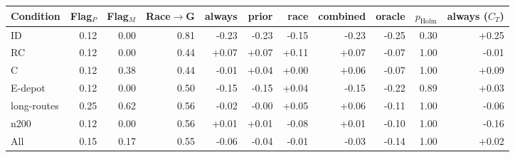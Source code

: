 \begin{tabular}{lrrrrrrrrrr}
\toprule
Condition & Flag$_{P}$ & Flag$_{M}$ & Race$\to$G & always & prior & race & combined & oracle & $p_{\mathrm{Holm}}$ & always ($C_T$) \\
\midrule
ID & 0.12 & 0.00 & 0.81 & -0.23 & -0.23 & -0.15 & -0.23 & -0.25 & 0.30 & +0.25 \\
RC & 0.12 & 0.00 & 0.44 & +0.07 & +0.07 & +0.11 & +0.07 & -0.07 & 1.00 & -0.01 \\
C & 0.12 & 0.38 & 0.44 & -0.01 & +0.04 & +0.00 & +0.06 & -0.07 & 1.00 & +0.09 \\
E-depot & 0.12 & 0.00 & 0.50 & -0.15 & -0.15 & +0.04 & -0.15 & -0.22 & 0.89 & +0.03 \\
long-routes & 0.25 & 0.62 & 0.56 & -0.02 & -0.00 & +0.05 & +0.06 & -0.11 & 1.00 & -0.06 \\
n200 & 0.12 & 0.00 & 0.56 & +0.01 & +0.01 & -0.08 & +0.01 & -0.10 & 1.00 & -0.16 \\
All & 0.15 & 0.17 & 0.55 & -0.06 & -0.04 & -0.01 & -0.03 & -0.14 & 1.00 & +0.02 \\
\bottomrule
\end{tabular}
